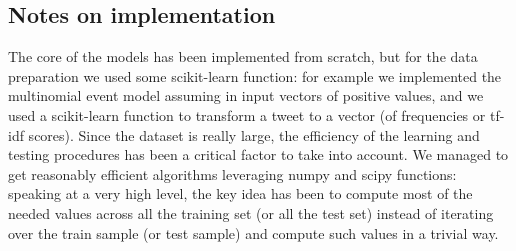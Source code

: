 \subsection*{Notes on implementation}
The core of the models has been implemented from scratch, but for the data preparation we used some scikit-learn function: for example we implemented the multinomial event model assuming in input vectors of positive values, and we used a scikit-learn function to transform a tweet to a vector (of frequencies or tf-idf scores). Since the dataset is really large, the efficiency of the learning and testing procedures has been a critical factor to take into account. We managed to get reasonably efficient algorithms leveraging numpy and scipy functions: speaking at a very high level, the key idea has been to compute most of the needed values across all the training set (or all the test set) instead of iterating over the train sample (or test sample) and compute such values in a trivial way.